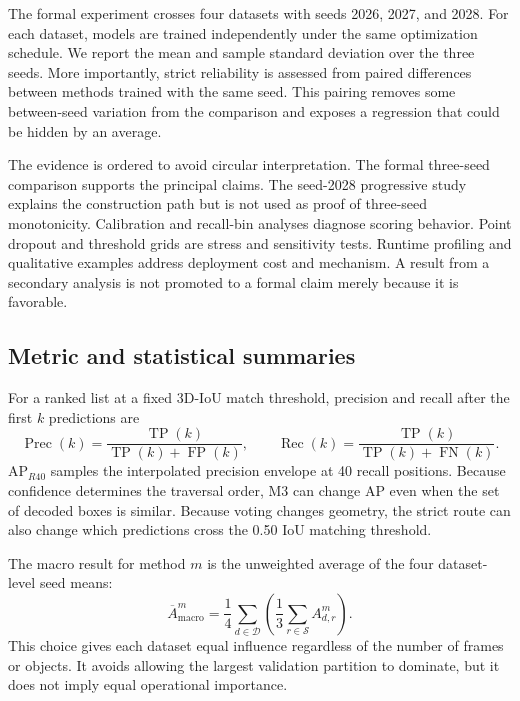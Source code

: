 \documentclass[preprint,12pt,times]{elsarticle}
\begin{document}
The formal experiment crosses four datasets with seeds 2026, 2027, and 2028.
For each dataset, models are trained independently under the same optimization
schedule. We report the mean and sample standard deviation over the three
seeds. More importantly, strict reliability is assessed from paired
differences between methods trained with the same seed. This pairing removes
some between-seed variation from the comparison and exposes a regression that
could be hidden by an average.

The evidence is ordered to avoid circular interpretation. The formal
three-seed comparison supports the principal claims. The seed-2028 progressive
study explains the construction path but is not used as proof of three-seed
monotonicity. Calibration and recall-bin analyses diagnose scoring behavior.
Point dropout and threshold grids are stress and sensitivity tests. Runtime
profiling and qualitative examples address deployment cost and mechanism. A
result from a secondary analysis is not promoted to a formal claim merely
because it is favorable.

\subsection{Metric and statistical summaries}

For a ranked list at a fixed 3D-IoU match threshold, precision and recall after
the first $k$ predictions are
\begin{equation}
\operatorname{Prec}(k)=\frac{\operatorname{TP}(k)}
{\operatorname{TP}(k)+\operatorname{FP}(k)},\qquad
\operatorname{Rec}(k)=\frac{\operatorname{TP}(k)}
{\operatorname{TP}(k)+\operatorname{FN}(k)}.
\end{equation}
AP$_{R40}$ samples the interpolated precision envelope at 40 recall positions.
Because confidence determines the traversal order, M3 can change AP even when
the set of decoded boxes is similar. Because voting changes geometry, the
strict route can also change which predictions cross the 0.50 IoU matching
threshold.

The macro result for method $m$ is the unweighted average of the four
dataset-level seed means:
\begin{equation}
\overline A_{\mathrm{macro}}^m =
\frac{1}{4}\sum_{d\in\mathcal{D}}
\left(\frac{1}{3}\sum_{r\in\mathcal{S}} A_{d,r}^m\right).
\end{equation}
This choice gives each dataset equal influence regardless of the number of
frames or objects. It avoids allowing the largest validation partition to
dominate, but it does not imply equal operational importance.
\end{document}
